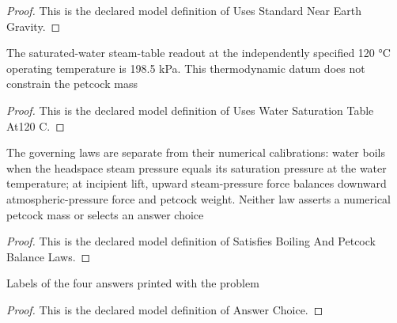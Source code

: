 \begin{proof}
  This is the declared model definition of Uses Standard Near Earth Gravity.
\end{proof}
\begin{definition}
  \label{def:physics:phyx-mini-0440:phyxminiproblems-problemphyxmini0440-useswatersaturationtableat120c}
  The saturated-water steam-table readout at the independently specified 120 °C operating temperature is 198.5 kPa. This thermodynamic datum does not constrain the petcock mass
\end{definition}
\begin{proof}
  This is the declared model definition of Uses Water Saturation Table At120 C.
\end{proof}
\begin{definition}
  \label{def:physics:phyx-mini-0440:phyxminiproblems-problemphyxmini0440-satisfiesboilingandpetcockbalancelaws}
  The governing laws are separate from their numerical calibrations: water boils when the headspace steam pressure equals its saturation pressure at the water temperature; at incipient lift, upward steam-pressure force balances downward atmospheric-pressure force and petcock weight. Neither law asserts a numerical petcock mass or selects an answer choice
\end{definition}
\begin{proof}
  This is the declared model definition of Satisfies Boiling And Petcock Balance Laws.
\end{proof}
\begin{definition}
  \label{def:physics:phyx-mini-0440:phyxminiproblems-problemphyxmini0440-answerchoice}
  Labels of the four answers printed with the problem
\end{definition}
\begin{proof}
  This is the declared model definition of Answer Choice.
\end{proof}
